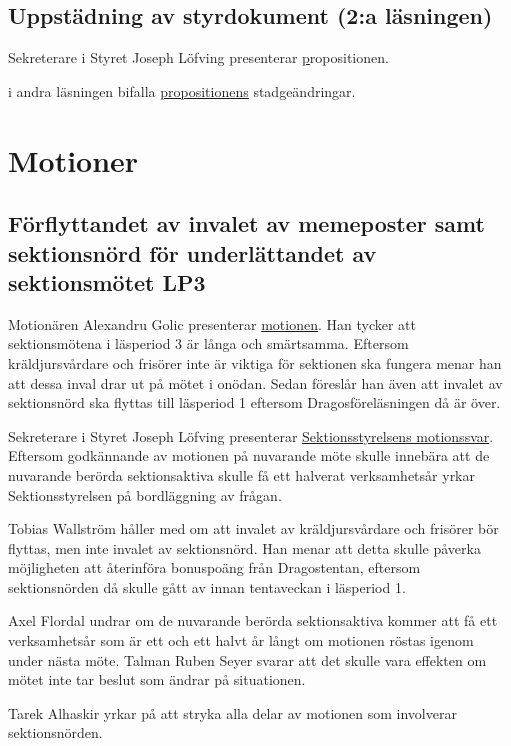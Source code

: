 \documentclass[hidelinks]{sektionsmote}
\begin{document}
\subsection{Uppstädning av styrdokument (2:a läsningen)}
Sekreterare i Styret Joseph Löfving presenterar \hyperlink{bilagor/prop/a.pdf.1}propositionen.

\begin{beslut}
  \item i andra läsningen bifalla \hyperlink{bilagor/prop/a.pdf.1}{propositionens} stadgeändringar.
\end{beslut}

\section{Motioner}

\subsection{Förflyttandet av invalet av memeposter samt sektionsnörd för underlättandet av sektionsmötet LP3}
Motionären Alexandru Golic presenterar \hyperlink{bilagor/motion/a.pdf.1}{motionen}.
Han tycker att sektionsmötena i läsperiod 3 är långa och smärtsamma.
Eftersom kräldjursvårdare och frisörer inte är viktiga för sektionen ska fungera menar han att dessa inval drar ut på mötet i onödan.
Sedan föreslår han även att invalet av sektionsnörd ska flyttas till läsperiod 1 eftersom Dragosföreläsningen då är över.

Sekreterare i Styret Joseph Löfving presenterar \hyperlink{bilagor/motion/asvar.pdf.1}{Sektionsstyrelsens motionssvar}.
Eftersom godkännande av motionen på nuvarande möte skulle innebära att de nuvarande berörda sektionsaktiva skulle få ett halverat verksamhetsår yrkar Sektionsstyrelsen på bordläggning av frågan.

Tobias Wallström håller med om att invalet av kräldjursvårdare och frisörer bör flyttas, men inte invalet av sektionsnörd.
Han menar att detta skulle påverka möjligheten att återinföra bonuspoäng från Dragostentan, eftersom sektionsnörden då skulle gått av innan tentaveckan i läsperiod 1.

Axel Flordal undrar om de nuvarande berörda sektionsaktiva kommer att få ett verksamhetsår som är ett och ett halvt år långt om motionen röstas igenom under nästa möte.
Talman Ruben Seyer svarar att det skulle vara effekten om mötet inte tar beslut som ändrar på situationen.

Tarek Alhaskir yrkar på att stryka alla delar av motionen som involverar sektionsnörden.
\end{document}
